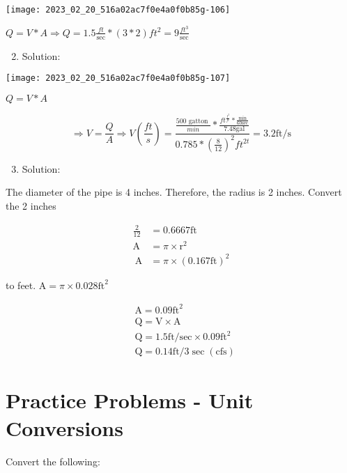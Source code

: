 \documentclass[10pt]{article}
\begin{document}
\begin{enumerate}
\begin{enumerate}
\begin{center}
\texttt{[image: 2023\_02\_20\_516a02ac7f0e4a0f0b85g-106]}
\end{center}

$Q=V * A \Longrightarrow Q=1.5 \frac{f t}{\sec } *(3 * 2) f t^{2}=9 \frac{f t^{3}}{\mathrm{sec}}$

\begin{enumerate}
  \setcounter{enumi}{1}
  \item Solution:
\end{enumerate}

\begin{center}
\texttt{[image: 2023\_02\_20\_516a02ac7f0e4a0f0b85g-107]}
\end{center}

$Q=V * A$

$$
\Longrightarrow V=\frac{Q}{A} \Longrightarrow V\left(\frac{f t}{s}\right)=\frac{\frac{500 \text { gatton }}{m i n} * \frac{f t^{\frac{f^{3}}{f t}} * \frac{\mathrm{min}}{60 \mathrm{sec}}}{7.48 \mathrm{gal}}}{0.785 *\left(\frac{8}{12}\right)^{2} f t^{2 t}}=3.2 \mathrm{ft} / \mathrm{s}
$$

\begin{enumerate}
  \setcounter{enumi}{2}
  \item Solution:
\end{enumerate}

The diameter of the pipe is 4 inches. Therefore, the radius is 2 inches. Convert the 2 inches

$$
\begin{aligned}
\frac{2}{12} & =0.6667 \mathrm{ft} \\
\mathrm{A} & =\pi \times \mathrm{r}^{2} \\
\mathrm{~A} & =\pi \times(0.167 \mathrm{ft})^{2}
\end{aligned}
$$

to feet. $\mathrm{A}=\pi \times 0.028 \mathrm{ft}^{2}$

$$
\begin{aligned}
& \mathrm{A}=0.09 \mathrm{ft}^{2} \\
& \mathrm{Q}=\mathrm{V} \times \mathrm{A} \\
& \mathrm{Q}=1.5 \mathrm{ft} / \mathrm{sec} \times 0.09 \mathrm{ft}^{2} \\
& \mathrm{Q}=0.14 \mathrm{ft} / 3 \sec (\mathrm{cfs})
\end{aligned}
$$

\section{Practice Problems - Unit Conversions}
Convert the following:


\end{enumerate}
\end{enumerate}
\end{document}
